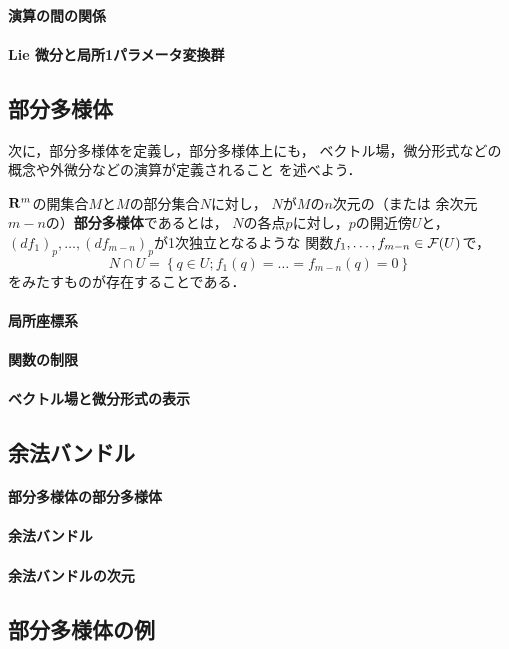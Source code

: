 \paragraph{演算の間の関係}
\paragraph{Lie 微分と局所1パラメータ変換群}
\subsection*{部分多様体}
次に，部分多様体を定義し，部分多様体上にも，
ベクトル場，微分形式などの概念や外微分などの演算が定義されること
を述べよう．
\begin{DFN}
    \(\mathbf{R}^m\)の開集合\(M\)と\(M\)の部分集合\(N\)に対し，
    \(N\)が\(M\)の\(n\)次元の（または
    余次元\(m-n\)の）\textbf{部分多様体}であるとは，
    \(N\)の各点\(p\)に対し，\(p\)の開近傍\(U\)と，
    \((df_1)_{p},\dots,(df_{m-n})_{p}\)が1次独立となるような
    関数\(f_1,\dots,f_{m-n}\in\mathcal{F}(U)\)で，
    \[
        N\cap U=\left\{q\in U;f_{1}(q)=\dots=f_{m-n}(q)=0\right\}
    \]をみたすものが存在することである．
\end{DFN}
\paragraph{局所座標系}
\paragraph{関数の制限}
\paragraph{ベクトル場と微分形式の表示}
\subsection*{余法バンドル}
\paragraph{部分多様体の部分多様体}
\paragraph{余法バンドル}
\paragraph{余法バンドルの次元}
\subsection*{部分多様体の例}
